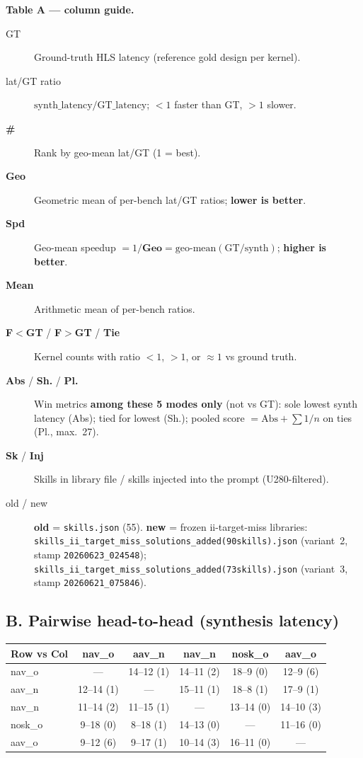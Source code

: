 \documentclass[11pt]{article}
\begin{document}
\medskip
\noindent\textbf{Table A --- column guide.}
\begin{description}
  \item[GT] Ground-truth HLS latency (reference gold design per kernel).
  \item[lat/GT ratio] $\text{synth\_latency} / \text{GT\_latency}$; $<1$ faster than GT, $>1$ slower.
  \item[\textbf{\#}] Rank by geo-mean lat/GT (1 = best).
  \item[\textbf{Geo}] Geometric mean of per-bench lat/GT ratios; \textbf{lower is better}.
  \item[\textbf{Spd}] Geo-mean speedup $= 1/\textbf{Geo} = \text{geo-mean}(\text{GT}/\text{synth})$; \textbf{higher is better}.
  \item[\textbf{Mean}] Arithmetic mean of per-bench ratios.
  \item[\textbf{F$<$GT} / \textbf{F$>$GT} / \textbf{Tie}] Kernel counts with ratio $<1$, $>1$, or $\approx 1$ vs ground truth.
  \item[\textbf{Abs} / \textbf{Sh.} / \textbf{Pl.}] Win metrics \textbf{among these 5 modes only} (not vs GT): sole lowest synth latency (Abs); tied for lowest (Sh.); pooled score $=\text{Abs}+\sum 1/n$ on ties (Pl., max.\ 27).
  \item[\textbf{Sk} / \textbf{Inj}] Skills in library file / skills injected into the prompt (U280-filtered).
  \item[old / new] \textbf{old} = \texttt{skills.json} (55). \textbf{new} = frozen ii-target-miss libraries:
    \texttt{skills\_ii\_target\_miss\_solutions\_added(90skills).json} (variant~2, stamp \texttt{20260623\_024548});
    \texttt{skills\_ii\_target\_miss\_solutions\_added(73skills).json} (variant~3, stamp \texttt{20260621\_075846}).
\end{description}

\subsection*{B. Pairwise head-to-head (synthesis latency)}

\begin{small}
\begin{tabular}{@{}l c c c c c@{}}
\toprule
\textbf{Row vs Col} & \textbf{nav\_o} & \textbf{aav\_n} & \textbf{nav\_n} & \textbf{nosk\_o} & \textbf{aav\_o} \\
\midrule
  nav\_o & --- & 14--12 (1) & 14--11 (2) & 18--9 (0) & 12--9 (6) \\
  aav\_n & 12--14 (1) & --- & 15--11 (1) & 18--8 (1) & 17--9 (1) \\
  nav\_n & 11--14 (2) & 11--15 (1) & --- & 13--14 (0) & 14--10 (3) \\
  nosk\_o & 9--18 (0) & 8--18 (1) & 14--13 (0) & --- & 11--16 (0) \\
  aav\_o & 9--12 (6) & 9--17 (1) & 10--14 (3) & 16--11 (0) & --- \\
\bottomrule
\end{tabular}
\end{small}
\end{document}
